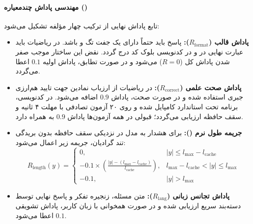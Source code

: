 \paragraph*{مهندسی پاداش چندمعیاره ()}
تابع پاداش نهایی از ترکیب چهار مؤلفه تشکیل می‌شود:
\begin{itemize}
    \item \textbf{پاداش قالب ($R_{\text{format}}$):} پاسخ باید حتماً دارای یک جفت تگ  و  باشد. در ریاضیات باید عبارت نهایی در  و در کدنویسی بلوک کد  درج گردد. نقض این ساختار موجب صفر شدن پاداش کل ($R=0$) می‌شود و در صورت تطابق، پاداش اولیه $0.1$ اعطا می‌گردد.
    \item \textbf{پاداش صحت علمی ($R_{\text{correct}}$):} در ریاضیات از ارزیاب نمادین  جهت تایید هم‌ارزی جبری استفاده شده و در صورت صحت، پاداش $0.9$ اضافه می‌شود. در کدنویسی، برنامه تحت استاندارد  کامپایل شده و روی ۲۰ آزمون تصادفی با مهلت ۴ ثانیه و سقف حافظه  ارزیابی می‌گردد؛ قبولی در همه آزمون‌ها پاداش $0.9$ به همراه دارد.
    \item \textbf{جریمه طول نرم ():} برای هشدار به مدل در نزدیکی سقف حافظه بدون بریدگی تند گرادیان، جریمه زیر اعمال می‌شود:
    \begin{equation}
        R_{\text{length}}(y) = \begin{cases} 
        0, & |y| \le l_{\max} - l_{\text{cache}} \\
        -0.1 \times \left( \frac{|y| - (l_{\max} - l_{\text{cache}})}{l_{\text{cache}}} \right), & l_{\max} - l_{\text{cache}} < |y| \le l_{\max} \\
        -0.1, & |y| > l_{\max} 
        \end{cases}
    \end{equation}
    \item \textbf{پاداش تجانس زبانی ($R_{\text{lang}}$):} متن مسئله، زنجیره تفکر و پاسخ نهایی توسط دسته‌بند سریع  \cite{joulin2016fasttext} ارزیابی شده و در صورت همخوانی با زبان کاربر، پاداش تشویقی $0.1$ اعطا می‌شود.
\end{itemize}

